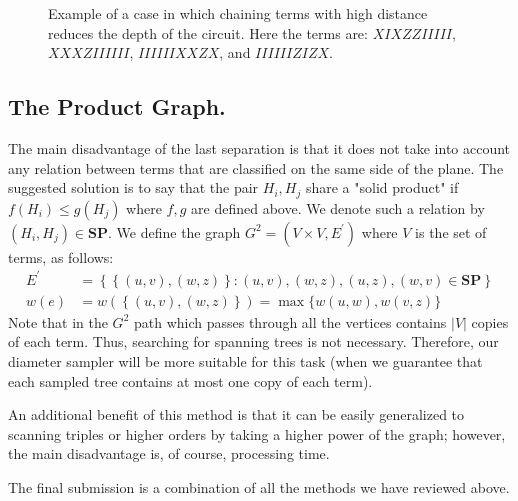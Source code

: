 \documentclass{article}
\begin{document}
\begin{figure}[h]
  
    \caption{ Example of a case in which chaining terms with high distance reduces the depth of the circuit. Here the terms are: \(XIXZZIIIII\), \(XXXZIIIIII\), \(IIIIIIXXZX\), and \(IIIIIIZIZX\). }
    \label{fig:average-data-vs-model}
\end{figure}
\begin{multicols}{2}

\section{The Product Graph.}
The main disadvantage of the last separation is that it does not take into account any relation between terms that are classified on the same side of the plane. The suggested solution is to say that the pair \(H_i, H_j\) share a "solid product" if  \( f\left(H_{i}\right) \le g \left(H_{j}\right) \) where \(f,g\) are defined above. We denote such a relation by \(\left(H_i, H_j\right) \in \textbf{SP} \). We define the graph \(G^2 = \left(V\times V , E^{\prime}\right)\) where \(V\) is the set of terms, as follows:
\begin{equation*}
    \begin{split}
        E^{\prime} &= \left\{ \left\{ (u,v),(w,z) \right\} : (u,v),(w,z),(u,z),(w,v) \in \textbf{SP} \right\}  \\
        w(e) &= w\left( \left\{ (u,v),(w,z) \right\} \right) = \max \{ w(u,w),w(v,z) \}
    \end{split}
\end{equation*}
Note that in the \(G^2\) path which passes through all the vertices contains \(|V|\) copies of each term. Thus, searching for spanning trees is not necessary. Therefore, our diameter sampler will be more suitable for this task (when we guarantee that each sampled tree contains at most one copy of each term).

An additional benefit of this method is that it can be easily generalized to scanning triples or higher orders by taking a higher power of the graph; however, the main disadvantage is, of course, processing time.

The final submission is a combination of all the methods we have reviewed above.
\printbibliography 
\end{multicols}
\pagebreak


\end{document}
